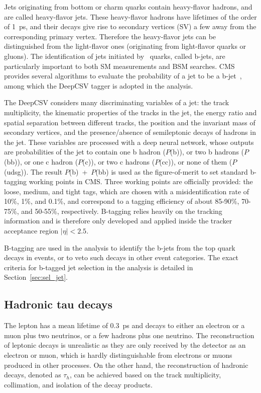 Jets originating from bottom or charm quarks contain heavy-flavor hadrons, and are called heavy-flavor jets.
These heavy-flavor hadrons have lifetimes of the order of 1~ps, and their decays give rise to secondary vertices (SV) a few \mm away from the corresponding primary vertex. 
Therefore the heavy-flavor jets can be distinguished from the light-flavor ones (originating from light-flavor quarks or gluons).
The identification of jets initiated by \Pqb~quarks, called b-jets, are particularly important to both SM measurements and BSM searches.
CMS provides several algorithms to evaluate the probability of a jet to be a b-jet~\cite{Sirunyan:2017ezt}, among which the DeepCSV tagger is adopted in the \hmm analysis.

The DeepCSV considers many discriminating variables of a jet: the track multiplicity, the kinematic properties of the tracks in the jet,
the energy ratio and spatial separation between different tracks, the position and the invariant mass of secondary vertices, 
and the presence/absence of semileptonic decays of hadrons in the jet.
These variables are processed with a deep neural network, whose outputs are probabilities of the jet to contain one b hadron ($P$(b)), or two b hadrons ($P$(bb)),
or one c hadron ($P$(c)), or two c hadrons ($P$(cc)), or none of them ($P$(udsg)).  
The result $P$(b)~+~$P$(bb) is used as the figure-of-merit to set standard b-tagging working points in CMS.
Three working points are officially provided: the loose, medium, and tight tags, 
which are chosen with a misidentification rate of 10\%, 1\%, and 0.1\%, 
and correspond to a tagging efficiency of about 85-90\%, 70-75\%, and 50-55\%, respectively.
B-tagging relies heavily on the tracking information and is therefore only developed and applied inside the tracker acceptance region $|\eta| < 2.5$.

B-tagging are used in the \hmm analysis to identify the b-jets from the top quark decays in \ttH events, 
or to veto such decays in other event categories.
The exact criteria for b-tagged jet selection in the \hmm analysis is detailed in Section~\ref{sec:sel_jet}.

\subsection{Hadronic tau decays}\label{sec:reco_tau}

The \tau{} lepton has a mean lifetime of 0.3~ps and decays to either an electron or a muon plus two neutrinos, or a few hadrons plus one neutrino.
The reconstruction of leptonic \tau{} decays is unrealistic as they are only received by the detector as an electron or muon, 
which is hardly distinguishable from electrons or muons produced in other processes.
On the other hand, the reconstruction of hadronic \tau{} decays, denoted as $\tau_{h}$, can be achieved based on the track multiplicity, collimation, and isolation of the decay products.  


